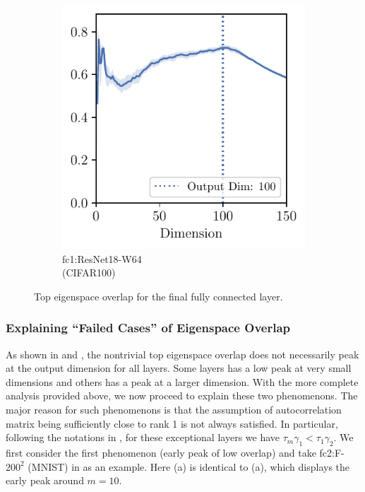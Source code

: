 \begin{figure}[H]
\begin{subfigure}[b]{0.24\textwidth}
        \includegraphics[width=\textwidth]{Appendix_Figures/Overlap_large_model/overlap_raw/last_layer/DimOverlap_CIFAR100_Resnet18W64New_nobn_fixlr0.01_fc1.pdf}
        \caption{fc1:ResNet18-W64\\(CIFAR100)}
        \label{fig:app_adexp_last_resnet}
    \end{subfigure}
    \captionsetup{justification=centering}
    \caption{Top eigenspace overlap for the final fully connected layer.}
    \label{fig:app_adexp_last}
\end{figure}


\subsubsection{Explaining ``Failed Cases'' of Eigenspace Overlap}
\label{sec:appendix-failure}
As shown in  and , the nontrivial top eigenspace overlap does not necessarily peak at the output dimension for all layers. Some layers has a low peak at very small dimensions and others has a peak at a larger dimension. With the more complete analysis provided above, we now proceed to explain these two phenomenons.
The major reason for such phenomenons is that the assumption of autocorrelation matrix being sufficiently close to rank 1 is not always satisfied. In particular, following the notations in , for these exceptional layers we have $\tau_m\gamma_1 < \tau_1\gamma_2$.
We first consider the first phenomenon (early peak of low overlap) and take fc2:F-$200^2$ (MNIST) in as an example. Here (a) is identical to (a), which displays the early peak around $m=10$.

